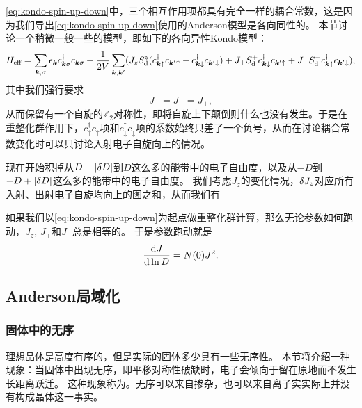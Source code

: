 \eqref{eq:kondo-spin-up-down}中，三个相互作用项都具有完全一样的耦合常数，这是因为我们导出\eqref{eq:kondo-spin-up-down}使用的Anderson模型是各向同性的。
本节讨论一个稍微一般一些的模型，即如下的各向异性Kondo模型：
\begin{equation}
    {H}_\text{eff} = \sum_{\vb*{k}, \sigma} \epsilon_{\vb*{k}} {c}^\dagger_{\vb*{k} \sigma} {c}_{\vb*{k} \sigma} + \frac{1}{2V} \sum_{\vb*{k}, \vb*{k}'} (
        J_z {S}_\text{d}^z ({c}^\dagger_{\vb*{k} \uparrow} {c}_{\vb*{k}' \uparrow} - {c}^\dagger_{\vb*{k} \downarrow} {c}_{\vb*{k}' \downarrow})
        + J_+ {S}^+_\text{d} {c}^\dagger_{\vb*{k} \downarrow} {c}_{\vb*{k}' \uparrow}
        + J_- {S}^-_\text{d} {c}^\dagger_{\vb*{k} \uparrow} {c}_{\vb*{k}' \downarrow}
    ),
\end{equation}
其中我们强行要求
\begin{equation}
    J_+ = J_- = J_\pm,
\end{equation}
从而保留有一个自旋的$\mathbb{Z}_2$对称性，即将自旋上下颠倒则什么也没有发生。于是在重整化群作用下，${c}^\dagger_\uparrow {c}_\uparrow$项和${c}^\dagger_\downarrow {c}_\downarrow$项的系数始终只差了一个负号，从而在讨论耦合常数变化时可以只讨论入射电子自旋向上的情况。

现在开始积掉从$D-\abs{\var{D}}$到$D$这么多的能带中的电子自由度，以及从$-D$到$-D+\abs{\var{D}}$这么多的能带中的电子自由度。
我们考虑$J_z$的变化情况，$\var{J_z}$对应所有入射、出射电子自旋均向上的图之和，从而我们有


如果我们以\eqref{eq:kondo-spin-up-down}为起点做重整化群计算，那么无论参数如何跑动，$J_z$, $J_+$和$J_-$总是相等的。
于是参数跑动就是
\begin{equation}
    \dv{J}{\ln D} = N(0) J^2.
\end{equation}

\subsection{Anderson局域化}

\subsubsection{固体中的无序}

理想晶体是高度有序的，但是实际的固体多少具有一些无序性。
本节将介绍一种现象：当固体中出现无序，即平移对称性破缺时，电子会倾向于留在原地而不发生长距离跃迁。
这种现象称为。无序可以来自掺杂，也可以来自离子实实际上并没有构成晶体这一事实。

